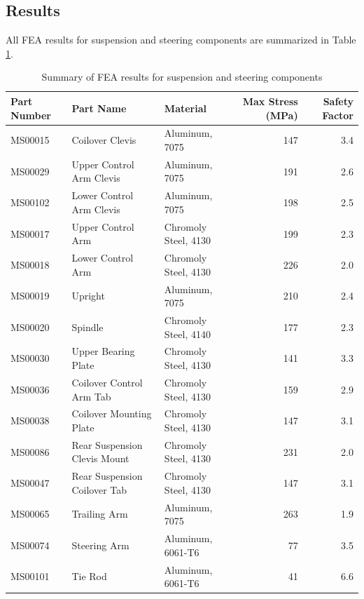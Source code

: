 \documentclass[10pt]{article}
\begin{document}
\subsection{Results}
All FEA results for suspension and steering components are summarized in Table \ref{tab:fea-results-suspension-steering}.

\begin{table}
\centering
\begin{tabular}{lllrr}
\toprule
Part Number & Part Name                    & Material             & Max Stress (\si{\mega\pascal}) & Safety Factor \\
\midrule
MS00015     & Coilover Clevis              & Aluminum, 7075       &                 147 &           3.4 \\
MS00029     & Upper Control Arm Clevis     & Aluminum, 7075       &                 191 &           2.6 \\
MS00102     & Lower Control Arm Clevis     & Aluminum, 7075       &                 198 &           2.5 \\
MS00017     & Upper Control Arm            & Chromoly Steel, 4130 &                 199 &           2.3 \\
MS00018     & Lower Control Arm            & Chromoly Steel, 4130 &                 226 &           2.0 \\
MS00019     & Upright                      & Aluminum, 7075       &                 210 &           2.4 \\
MS00020     & Spindle                      & Chromoly Steel, 4140 &                 177 &           2.3 \\
MS00030     & Upper Bearing Plate          & Chromoly Steel, 4130 &                 141 &           3.3 \\
MS00036     & Coilover Control Arm Tab     & Chromoly Steel, 4130 &                 159 &           2.9 \\
MS00038     & Coilover Mounting Plate      & Chromoly Steel, 4130 &                 147 &           3.1 \\
MS00086     & Rear Suspension Clevis Mount & Chromoly Steel, 4130 &                 231 &           2.0 \\
MS00047     & Rear Suspension Coilover Tab & Chromoly Steel, 4130 &                 147 &           3.1 \\
MS00065     & Trailing Arm                 & Aluminum, 7075       &                 263 &           1.9 \\
MS00074     & Steering Arm                 & Aluminum, 6061-T6    &                  77 &           3.5 \\
MS00101     & Tie Rod                      & Aluminum, 6061-T6    &                  41 &           6.6 \\
\bottomrule
\end{tabular}
\caption{Summary of FEA results for suspension and steering components}
\label{tab:fea-results-suspension-steering}
\end{table}
\end{document}
